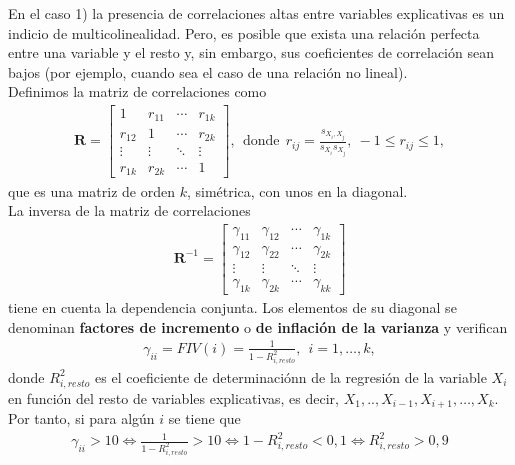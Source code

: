 \noindent En el caso 1) la presencia de correlaciones altas entre variables explicativas es un indicio de
multicolinealidad. Pero, es posible que exista una relación perfecta entre una variable y el resto y, sin embargo, sus coeficientes de correlación sean bajos (por ejemplo, cuando sea el caso de una relación no lineal).
\\
\newline
Definimos la matriz de correlaciones como
\begin{align*}
    \textbf{R} = \begin{bmatrix}
    1 & r_{11}  & \cdots & r_{1k} \\
    r_{12} & 1  & \cdots & r_{2k} \\
    \vdots  & \vdots & \ddots & \vdots \\
    r_{1k} & r_{2k}  & \cdots & 1 
    \end{bmatrix}, \ \ \text{donde} \ \ r_{ij} = \frac{s_{X_i,X_j}}{s_{X_i}s_{X_j}}, \ -1 \leq r_{ij} \leq 1,
\end{align*}
que es una matriz de orden $k$, simétrica, con unos en la diagonal.
\\
\newline
La inversa de la matriz de correlaciones
\begin{align*}
    \textbf{R}^{-1} = \begin{bmatrix}
    \gamma_{11} & \gamma_{12}  & \cdots & \gamma_{1k} \\
    \gamma_{12} & \gamma_{22}  & \cdots & \gamma_{2k} \\
    \vdots  & \vdots & \ddots & \vdots \\
    \gamma_{1k} & \gamma_{2k}  & \cdots & \gamma_{kk} 
    \end{bmatrix}
\end{align*}
tiene en cuenta la dependencia conjunta. Los elementos de su diagonal se denominan \textbf{factores de incremento} o \textbf{de inflación de la varianza} y verifican
\begin{align*}
    \gamma_{ii} = FIV(i) = \frac{1}{1 - R^2_{i,resto}}, \ \ i = 1,\ldots,k,
\end{align*}
donde $R^2_{i,resto}$ es el coeficiente de determinaciónn de la regresión de la variable $X_i$ en función del resto de variables explicativas, es decir, $X_1,..,X_{i-1},X_{i+1},\ldots,X_k$. Por tanto, si para algún $i$ se tiene que
\begin{align*}
    \gamma_{ii} > 10 \Longleftrightarrow \frac{1}{1-R^2_{i,resto}} > 10 \Longleftrightarrow 1- R^2_{i,resto} < 0,1 \Longleftrightarrow R^2_{i,resto} > 0,9
\end{align*}
